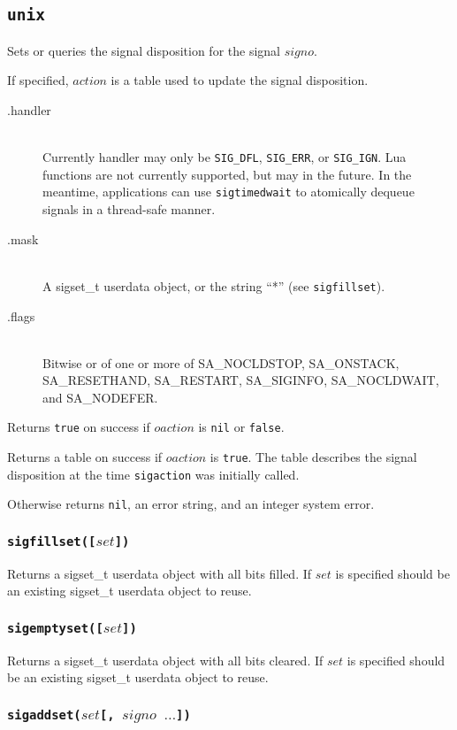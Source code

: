 \documentclass[11pt, oneside]{memoir}
\newcommand*{\true}[0]{\texttt{true}\xspace}
\newcommand*{\false}[0]{\texttt{false}\xspace}
\newcommand*{\nil}[0]{\texttt{nil}\xspace}
\newcommand*{\syscall}[1]{\texttt{#1}\xspace}
\newcommand*{\fn}[1]{\texttt{#1}\xspace}
\newcounter{toccols}
\newenvironment{Module}[1]{
	\subsection{\texttt{#1}}
	\addtocontents{toc}{
		\protect\begin{multicols}{\value{toccols}}
	}
}{
	\addtocontents{toc}{\protect\end{multicols}}
}
\begin{document}
\begin{Module}{unix}
Sets or queries the signal disposition for the signal $signo$.

If specified, $action$ is a table used to update the signal disposition.

\begin{description}
\item[.handler] \hfill \\
Currently handler may only be \texttt{SIG\_DFL}, \texttt{SIG\_ERR}, or \texttt{SIG\_IGN}.
Lua functions are not currently supported, but may in the future. In the meantime, applications can use \fn{sigtimedwait} to atomically dequeue signals in a thread-safe manner.
\item[.mask] \hfill \\
A sigset\_t userdata object, or the string ``*'' (see \fn{sigfillset}).
\item[.flags] \hfill \\
Bitwise or of one or more of SA\_NOCLDSTOP, SA\_ONSTACK, SA\_RESETHAND, SA\_RESTART, SA\_SIGINFO, SA\_NOCLDWAIT, and SA\_NODEFER.
\end{description}

Returns \true on success if $oaction$ is \nil or \false.

Returns a table on success if $oaction$ is \true. The table describes the signal disposition at the time \syscall{sigaction} was initially called.

Otherwise returns \nil, an error string, and an integer system error.

\subsubsection[\fn{sigfillset}]{\fn{sigfillset([$set$])}}

Returns a sigset\_t userdata object with all bits filled. If $set$ is specified should be an existing
sigset\_t userdata object to reuse.

\subsubsection[\fn{sigemptyset}]{\fn{sigemptyset([$set$])}}

Returns a sigset\_t userdata object with all bits cleared. If $set$ is specified should be an existing
sigset\_t userdata object to reuse.

\subsubsection[\fn{sigaddset}]{\fn{sigaddset($set$[, $signo$ $\ldots$])}}


\end{Module}
\end{document}
